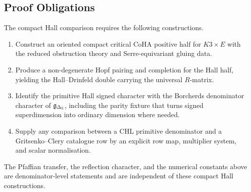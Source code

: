 \subsection*{Proof Obligations}

The compact Hall comparison requires the following constructions.
\begin{enumerate}
\item Construct an oriented compact critical CoHA positive half for
$K3\times E$ with the reduced obstruction theory and Serre-equivariant
gluing data.
\item Produce a non-degenerate Hopf pairing and completion for the
Hall half, yielding the Hall--Drinfeld double carrying the universal
$R$-matrix.
\item Identify the primitive Hall signed character with the
Borcherds denominator character of $\mathfrak{g}_{\Delta{}_{5}}$,
including the parity fixture that turns signed superdimension into
ordinary dimension where needed.
\item Supply any comparison between a CHL primitive denominator and a
Gritsenko--Clery catalogue row by an explicit row map, multiplier
system, and scalar normalisation.
\end{enumerate}
The Pfaffian transfer, the reflection character, and the numerical
constants above are denominator-level statements and are independent
of these compact Hall constructions.
